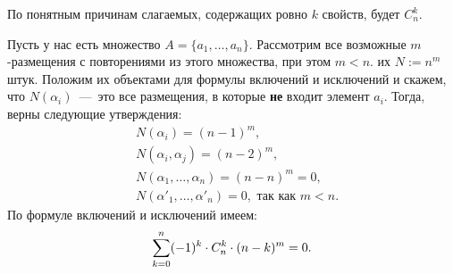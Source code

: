 \begin{note}
	По понятным причинам слагаемых, содержащих ровно $k$ свойств, будет $C_n^k$.
\end{note}

\begin{corollary}
	Пусть у нас есть множество $A = \{a_1, \ldots, a_n\}$. Рассмотрим все возможные $m$-размещения с повторениями из этого множества, при этом $m < n$. их $N := n^m$ штук. Положим их объектами для формулы включений и исключений и скажем, что $N(\alpha_i)$~---~это все размещения, в которые \textbf{не} входит элемент $a_i$. Тогда, верны следующие утверждения:
	\begin{align*}
		&N(\alpha_i) = (n - 1)^m,
		\\
		&N(\alpha_i, \alpha_j) = (n - 2)^m,
		\\
		&N(\alpha_1, \ldots, \alpha_n) = (n - n)^m = 0,
		\\
		&N(\alpha'_1, \ldots, \alpha'_n) = 0, \text{ так как } m < n.
	\end{align*}
	По формуле включений и исключений имеем:
	\[
		\sum\limits_{k = 0}^n (-1)^k \cdot C_n^k \cdot (n - k)^m = 0.
	\]
\end{corollary}